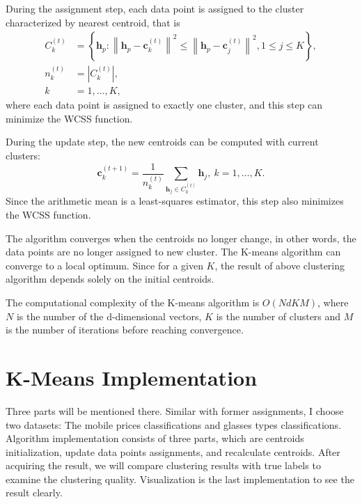 \documentclass[12pt,a4paper]{article}
\begin{document}
During the assignment step, each data point is assigned to the cluster characterized by nearest centroid, that is
\begin{equation}
\begin{aligned}
C_{k}^{\left(t\right)}&=\left \{{ \mathbf {h}_{p}:\left \|{\mathbf {h}_{p} - \mathbf {c}_{k}^{\left(t\right)}}\right \|^{2}\le \left \|{ \mathbf {h}_{p} - \mathbf {c}_{j}^{\left(t\right)} }\right \|^{2}, 1\leq j\leq K }\right \}, \\[6pt]
n_{k}^{\left(t\right)}&=|C_{k}^{\left(t\right)}|, \\[6pt]
k&=1,\ldots , K,
\end{aligned}
\end{equation}
where each data point is assigned to exactly one cluster, and this step can minimize the WCSS function.

During the update step, the new centroids can be computed with current clusters:
\begin{equation} 
\mathbf c_{k} ^{\left ({t+1}\right )} = \frac {1}{n_{k}^{(t)}} \sum _{\mathbf h_{j} \in C_{k}^{\left ({t}\right )}} \mathbf h_{j},~k=1,\ldots ,K. 
\end{equation}
Since the arithmetic mean is a least-squares estimator, this step also minimizes the WCSS function.

The algorithm converges when the centroids no longer change, in other words, the data points are no longer assigned to new cluster. The K-means algorithm can converge to a local optimum. Since for a given $K$, the result of above clustering algorithm depends solely on the initial centroids.

The computational complexity of the K-means algorithm is $O(NdKM)$, where $N$ is the number of the d-dimensional vectors, $K$ is the number of clusters and $M$ is the number of iterations before reaching convergence.

\section{K-Means Implementation}
Three parts will be mentioned there. Similar with former assignments, I choose two datasets: The mobile prices classifications and glasses types classifications. Algorithm implementation consists of three parts, which are centroids initialization, update data points assignments, and recalculate centroids. After acquiring the result, we will compare clustering results with true labels to examine the clustering quality. Visualization is the last implementation to see the result clearly.
\end{document}
